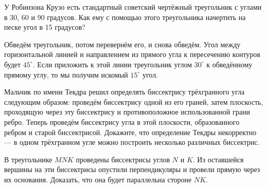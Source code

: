 \begin{itemize}
\itA У Робинзона Крузо есть стандартный советский чертёжный треугольник с углами в 30, 60 и 90 градусов. 
Как ему с помощью этого треугольника начертить на песке угол в 15 градусов?

Обведём треугольник, потом перевернём его, и снова обведём.
Угол между горизонтальной линией и направлением из прямого угла к пересечению контуров будет $45^\circ$.
Если приложить к этой линии треугольник углом $30^\circ$ к обведённому прямому углу, то мы получим 
искомый $15^\circ$ угол.

\begin{center}\end{center}

\itB Мальчик по имени Текдра решил определять биссектрису трёхгранного угла следующим образом: проведём 
биссектрису одной из его граней, затем плоскость, проходящую через эту биссектрису и противоположное 
использованной грани ребро. Теперь проведём биссектрису угла в этой плоскости, образованного ребром и 
старой биссектрисой. Докажите, что определение Текдры некорректно — в одном трёхгранном угле можно построить 
несколько различных биссектрис.

\itC В треугольнике $MNK$ проведены биссектрисы углов $N$ и $K$. Из оставшейся вершины на эти биссектрисы 
опустили перпендикуляры и провели прямую через их основания. Доказать, что она будет параллельна стороне $NK$.


\end{itemize}
